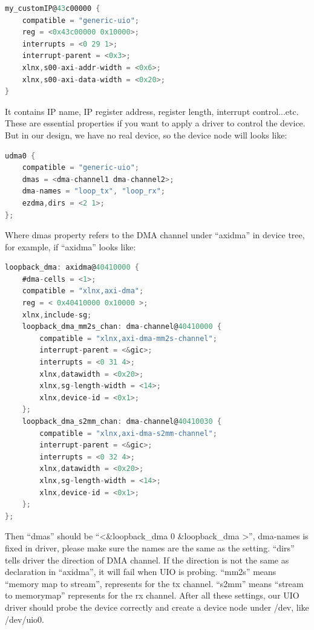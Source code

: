 {\renewcommand\baselinestretch{0.8}\selectfont
\begin{lstlisting}[frame=single,language=C]
my_customIP@43c00000 {
	compatible = "generic-uio";
	reg = <0x43c00000 0x10000>;
	interrupts = <0 29 1>;
	interrupt-parent = <0x3>;
	xlnx,s00-axi-addr-width = <0x6>;
	xlnx,s00-axi-data-width = <0x20>;
}
\end{lstlisting}
\par}

It contains IP name, IP register address, register length, interrupt control...etc. These are essential properties if you want to apply a driver to control the device. But in our design, we have no real device, so the device node will looks like:

{\renewcommand\baselinestretch{0.8}\selectfont
\begin{lstlisting}[frame=single,language=C]
udma0 {
    compatible = "generic-uio";
    dmas = <dma-channel1 dma-channel2>;
    dma-names = "loop_tx", "loop_rx";   
    ezdma,dirs = <2 1>;                 
};
\end{lstlisting}
\par}

Where dmas property refers to the DMA channel under ``axidma'' in device tree, for example, if ``axidma'' looks like:

{\renewcommand\baselinestretch{0.8}\selectfont
\begin{lstlisting}[frame=single,language=C]
loopback_dma: axidma@40410000 {
    #dma-cells = <1>;
    compatible = "xlnx,axi-dma";
    reg = < 0x40410000 0x10000 >;
    xlnx,include-sg;
    loopback_dma_mm2s_chan: dma-channel@40410000 {
        compatible = "xlnx,axi-dma-mm2s-channel";
        interrupt-parent = <&gic>;
        interrupts = <0 31 4>; 
        xlnx,datawidth = <0x20>;        
        xlnx,sg-length-width = <14>;    
        xlnx,device-id = <0x1>;     
    };
	loopback_dma_s2mm_chan: dma-channel@40410030 {
        compatible = "xlnx,axi-dma-s2mm-channel";
        interrupt-parent = <&gic>;
        interrupts = <0 32 4>;  
        xlnx,datawidth = <0x20>;       
        xlnx,sg-length-width = <14>;    
        xlnx,device-id = <0x1>;    
    };
};
\end{lstlisting}
\par}

Then ``dmas'' should be ``<\&loopback\_dma 0 \&loopback\_dma >'', dma-names is fixed in driver, please make sure the names are the same as the setting. ``dirs'' tells driver the direction of DMA channel. If the direction is not the same as declaration in ``axidma'', it will fail when UIO is probing. ``mm2s'' means ``memory map to stream'', represents for the tx channel. ``s2mm'' means ``stream to memorymap'' represents for the rx channel. After all these settings, our UIO driver should probe the device correctly and create a device node under /dev, like /dev/uio0.

